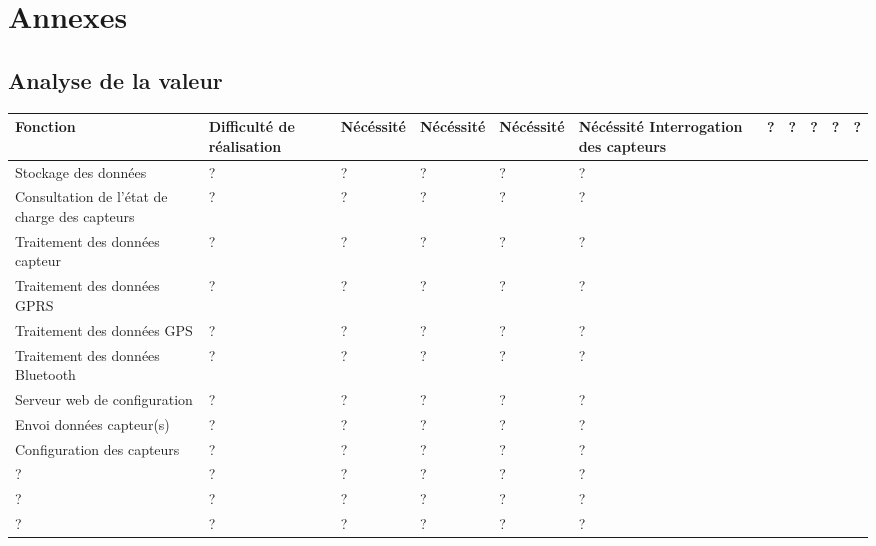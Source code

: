 \vfil
\pagebreak
\section{Annexes}

\subsection{Analyse de la valeur}

\begin{center}
\begin{longtable}{|m{6cm}|m{17mm}|m{17mm}|m{17mm}|m{17mm}|m{17mm}|}
\hline
Fonction & Difficulté de réalisation & Nécéssité & Nécéssité & Nécéssité & Nécéssité\endhead
\hline
Interrogation des capteurs
& %
?
& %
?
& %
?
& %
?
& %
?
\\\hline
Stockage des données
& %
?
& %
?
& %
?
& %
?
& %
?
\\\hline
Consultation de l'état de charge des capteurs
& %
?
& %
?
& %
?
& %
?
& %
?
\\\hline
Traitement des données capteur
& %
?
& %
?
& %
?
& %
?
& %
?
\\\hline
Traitement des données GPRS
& %
?
& %
?
& %
?
& %
?
& %
?
\\\hline
Traitement des données GPS
& %
?
& %
?
& %
?
& %
?
& %
?
\\\hline
Traitement des données Bluetooth
& %
?
& %
?
& %
?
& %
?
& %
?
\\\hline
Serveur web de configuration
& %
?
& %
?
& %
?
& %
?
& %
?
\\\hline
Envoi données capteur(s)
& %
?
& %
?
& %
?
& %
?
& %
?
\\\hline
Configuration des capteurs
& %
?
& %
?
& %
?
& %
?
& %
?
\\\hline
?
& %
?
& %
?
& %
?
& %
?
& %
?
\\\hline
?
& %
?
& %
?
& %
?
& %
?
& %
?
\\\hline
?
& %
?
& %
?
& %
?
& %
?
& %
?
\\\hline
\end{longtable}
\end{center}
